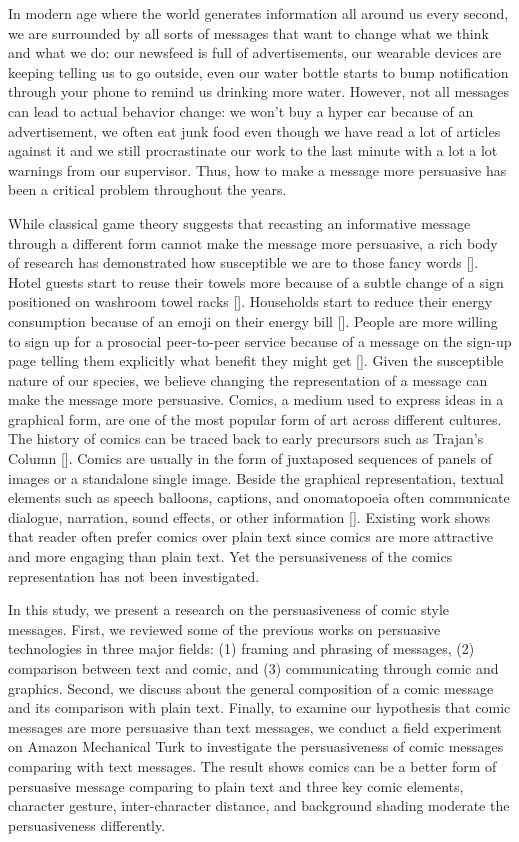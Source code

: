 In modern age where the world generates information all around us every second, we are surrounded by all sorts of messages that want to change what we think and what we do: our newsfeed is full of advertisements, our wearable devices are keeping telling us to go outside, even our water bottle starts to bump notification through your phone to remind us drinking more water. However, not all messages can lead to actual behavior change: we won't buy a hyper car because of an advertisement, we often eat junk food even though we have read a lot of articles against it and we still procrastinate our work to the last minute with a lot a lot warnings from our supervisor. Thus, how to make a message more persuasive has been a critical problem throughout the years.\par
While classical game theory suggests that recasting an informative message through a different form cannot make the message more persuasive, a rich body of research has demonstrated how susceptible we are to those fancy words []. Hotel guests start to reuse their towels more because of a subtle change of a sign positioned on washroom towel racks []. Households start to reduce their energy consumption because of an emoji on their energy bill []. People are more willing to sign up for a prosocial peer-to-peer service because of a message on the sign-up page telling them explicitly what benefit they might get []. Given the susceptible nature of our species, we believe changing the representation of a message can make the message more persuasive.
Comics, a medium used to express ideas in a graphical form, are one of the most popular form of art across different cultures. The history of comics can be traced back to early precursors such as Trajan’s Column []. Comics are usually in the form of juxtaposed sequences of panels of images or a standalone single image. Beside the graphical representation, textual elements such as speech balloons, captions, and onomatopoeia often communicate dialogue, narration, sound effects, or other information []. Existing work shows that reader often prefer comics over plain text since comics are more attractive and more engaging than plain text. Yet the persuasiveness of the comics representation has not been investigated.\par
In this study, we present a research on the persuasiveness of comic style messages. First, we reviewed some of the previous works on persuasive technologies in three major fields: (1) framing and phrasing of messages, (2) comparison between text and comic, and (3) communicating through comic and graphics. Second, we discuss about the general composition of a comic message and its comparison with plain text. Finally, to examine our hypothesis that comic messages are more persuasive than text messages, we conduct a field experiment on Amazon Mechanical Turk to investigate the persuasiveness of comic messages comparing with text messages. The result shows comics can be a better form of persuasive message comparing to plain text and three key comic elements, character gesture, inter-character distance, and background shading moderate the persuasiveness differently.\par
